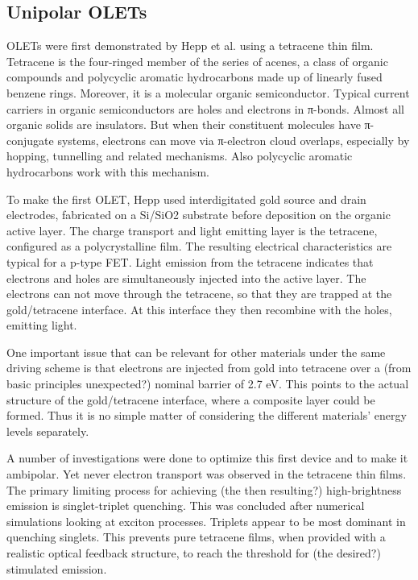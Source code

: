 \subsection{Unipolar OLETs}\label{sec:ambipolar_olets} %

OLETs were first demonstrated by Hepp et al. using a tetracene thin film. Tetracene is the four-ringed member of the series of acenes, a class of organic compounds and polycyclic aromatic hydrocarbons made up of linearly fused benzene rings. Moreover, it is a molecular organic semiconductor. Typical current carriers in organic semiconductors are holes and electrons in π-bonds. Almost all organic solids are insulators. But when their constituent molecules have π-conjugate systems, electrons can move via π-electron cloud overlaps, especially by hopping, tunnelling and related mechanisms. Also polycyclic aromatic hydrocarbons work with this mechanism.

To make the first OLET, Hepp used interdigitated gold source and drain electrodes, fabricated on a Si/SiO2 substrate before deposition on the organic active layer. The charge transport and light emitting layer is the tetracene, configured as a polycrystalline film. The resulting electrical characteristics are typical for a p-type FET. Light emission from the tetracene indicates that electrons and holes are simultaneously injected into the active layer. The electrons can not move through the tetracene, so that they are trapped at the gold/tetracene interface. At this interface they then recombine with the holes, emitting light.

One important issue that can be relevant for other materials under the same driving scheme is that electrons are injected from gold into tetracene over a (from basic principles unexpected?) nominal barrier of 2.7 eV. This points to the actual structure of the gold/tetracene interface, where a composite layer could be formed. Thus it is no simple matter of considering the different materials' energy levels separately. 

A number of investigations were done to optimize this first device and to make it ambipolar. Yet never electron transport was observed in the tetracene thin films. The primary limiting process for achieving (the then resulting?) high-brightness emission is singlet-triplet quenching. This was concluded after numerical simulations looking at exciton processes. Triplets appear to be most dominant in quenching singlets. This prevents pure tetracene films, when provided with a realistic optical feedback structure, to reach the threshold for (the desired?) stimulated emission.

